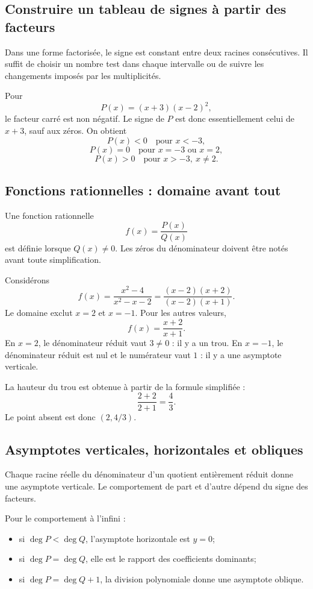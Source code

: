 \subsection{Construire un tableau de signes à partir des facteurs}

Dans une forme factorisée, le signe est constant entre deux racines consécutives. Il suffit de choisir un nombre test dans chaque intervalle ou de suivre les changements imposés par les multiplicités.

Pour
\[
P(x)=(x+3)(x-2)^2,
\]
le facteur carré est non négatif. Le signe de $P$ est donc essentiellement celui de $x+3$, sauf aux zéros. On obtient
\[
P(x)<0\quad\text{pour }x<-3,
\]
\[
P(x)=0\quad\text{pour }x=-3\text{ ou }x=2,
\]
\[
P(x)>0\quad\text{pour }x>-3,\ x\neq2.
\]

\subsection{Fonctions rationnelles : domaine avant tout}

Une fonction rationnelle
\[
f(x)=\frac{P(x)}{Q(x)}
\]
est définie lorsque $Q(x)\neq0$. Les zéros du dénominateur doivent être notés avant toute simplification.

Considérons
\[
f(x)=\frac{x^2-4}{x^2-x-2}
=
\frac{(x-2)(x+2)}{(x-2)(x+1)}.
\]
Le domaine exclut $x=2$ et $x=-1$. Pour les autres valeurs,
\[
f(x)=\frac{x+2}{x+1}.
\]
En $x=2$, le dénominateur réduit vaut $3\ne0$ : il y a un trou. En $x=-1$, le dénominateur réduit est nul et le numérateur vaut $1$ : il y a une asymptote verticale.

La hauteur du trou est obtenue à partir de la formule simplifiée :
\[
\frac{2+2}{2+1}=\frac43.
\]
Le point absent est donc $(2,4/3)$.

\subsection{Asymptotes verticales, horizontales et obliques}

Chaque racine réelle du dénominateur d'un quotient entièrement réduit donne une asymptote verticale. Le comportement de part et d'autre dépend du signe des facteurs.

Pour le comportement à l'infini :
\begin{itemize}
\item si $\deg P<\deg Q$, l'asymptote horizontale est $y=0$;
\item si $\deg P=\deg Q$, elle est le rapport des coefficients dominants;
\item si $\deg P=\deg Q+1$, la division polynomiale donne une asymptote oblique.
\end{itemize}

